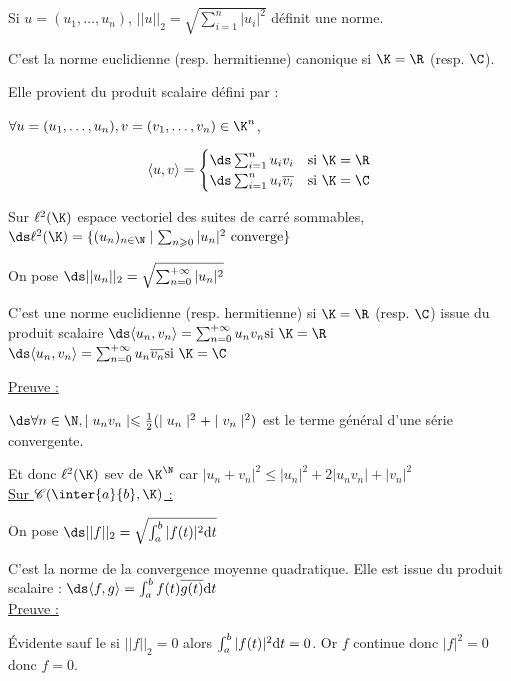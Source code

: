 \begin{exemple}
    Si $u = (u_1, \dots, u_n)$, $\displaystyle ||u||_2 = \sqrt{\sum_{i = 1}^{n} |u_i|^2}$
    définit une norme. 

    C'est la norme euclidienne (resp. hermitienne) canonique si $\K = \R$ (resp. $\C$). 

    Elle provient du produit scalaire défini par : 

    $\forall u = (u_1, \dots, u_n), v = (v_1, \dots, v_n) \in \K^n$,

    $$
    \langle u, v \rangle = \begin{cases}
        \ds \sum_{i = 1}^{n} u_i v_i & \text{si } \K = \R \\
        \ds \sum_{i = 1}^{n} u_i \overline{v_i} & \text{si } \K = \C \\
    \end{cases}
    $$

    Sur $\ell^2(\K)$ espace vectoriel des suites de carré sommables,
    $\ds \ell^2(\K) = \{(u_n)_{n \in \N} \mid \sum_{n \geqslant 0} |u_n|^2 \text{ converge}\}$
    
    On pose $\ds ||u_n||_2 = \sqrt{\sum_{n = 0 }^{+ \infty} |u_n|^2}$

    C'est une norme euclidienne (resp. hermitienne) si $\K = \R$ (resp. $\C$) issue
    du produit scalaire $\ds \langle u_n, v_n \rangle = \sum_{n = 0}^{+ \infty} u_n v_n \text{si } \K = \R$
    $\ds \langle u_n, v_n \rangle = \sum_{n = 0}^{+ \infty} u_n \overline{v_n} \text{si } \K = \C$

    \uline{Preuve :}

    \svspace $\ds \forall n \in \N, \mid u_n v_n \mid \leqslant \frac 1 2 (\mid u_n \mid^2 + \mid v_n \mid^2)$ est le terme
    général d'une série convergente. 

    Et donc $\ell^2(\K)$ sev de $\K^{\N}$ car $|u_n + v_n|^2 \leqslant |u_n|^2 + 2 |u_n v_n| + |v_n|^2$ \\

    \uline{Sur $\mathscr C(\inter{a}{b}, \K)$ :}

    \avspace On pose $\ds ||f||_2 = \sqrt{\int_{a}^{b} |f(t)|^2 \text d t}$

    C'est la norme de la convergence moyenne quadratique. Elle est issue du produit scalaire :
    $\ds \langle f, g \rangle = \int_{a}^{b} f(t) \overline{g(t)} \text d t$ \\

    \uline{Preuve :}

    Évidente sauf le si $||f||_2 = 0$ alors $\int_{a }^{b } |f(t)|^2 \text d t = 0$. Or $f$ continue donc $|f|^2 = 0 $ donc $f = 0$.
\end{exemple}


